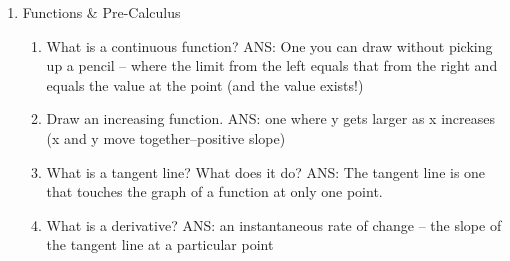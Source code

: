 \documentclass[11pt]{article}
\begin{document}
\begin{enumerate}
\item Functions \& Pre-Calculus
\begin{enumerate}
\item What is a continuous function?  \color{gray} ANS: One you can draw without picking up a pencil -- where the limit from the left equals that from the right and equals the value at the point (and the value exists!) \color{black} \\
\item Draw an increasing function. \color{gray} ANS: one where y gets larger as x increases (x and y move together--positive slope) \color{black} \\
\newline
\item What is a tangent line? What does it do? \color{gray} ANS: The tangent line is one that touches the graph of a function at only one point.  \color{black} \\
\item What is a derivative?  \color{gray} ANS: an instantaneous rate of change -- the slope of the tangent line at a particular point \color{black} \\
\end{enumerate}


\end{enumerate}
\end{document}

